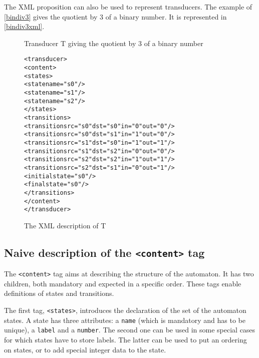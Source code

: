 \documentclass[a4paper]{article}
\newcommand{\xtag}[1]{\texttt{<#1>}}
\newcommand{\xattr}[1]{\texttt{#1}}
\begin{document}
The XML proposition can also be used to represent transducers. The example of
\autoref{bindiv3} gives the quotient by 3 of a binary number. It is
represented in \autoref{bindiv3xml}.


\begin{figure}[ht]
  \begin{center}
\caption{Transducer T giving the quotient by 3 of a binary number}
\label{bindiv3}
  \end{center}
\end{figure}

\small
\begin{figure}[ht]
  \begin{center}
\begin{alltt}
<transducer>
  <content>
    <states>
       <state name="s0"/>
       <state name="s1"/>
       <state name="s2"/>
    </states>
    <transitions>
       <transition src="s0" dst="s0" in="0" out="0"/>
       <transition src="s0" dst="s1" in="1" out="0"/>
       <transition src="s1" dst="s0" in="1" out="1"/>
       <transition src="s1" dst="s2" in="0" out="0"/>
       <transition src="s2" dst="s2" in="1" out="1"/>
       <transition src="s2" dst="s1" in="0" out="1"/>
       <initial state="s0"/>
       <final state="s0"/>
    </transitions>
  </content>
</transducer>
\end{alltt}

\caption{The XML description of T}
\label{bindiv3xml}
  \end{center}
\end{figure}

\newpage
\subsection{Naive description of the \xtag{content} tag}

The \xtag{content} tag aims at describing the structure of the
automaton. It has two children, both mandatory and expected
in a specific order. These tags enable definitions of states
and transitions.

The first tag, \xtag{states}, introduces the declaration of
the set of the automaton states. A state has three attributes: a
\xattr{name} (which is mandatory and has to be unique), a \xattr{label}
and a \xattr{number}. The second one can be used in some special cases for
which states have to store labels. The latter can be used to put an ordering on
states, or to add special integer data to the state.
\end{document}

